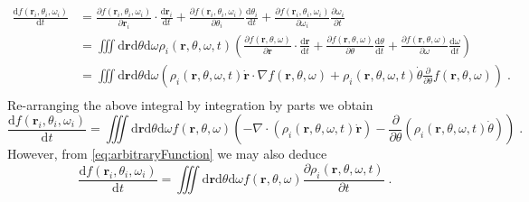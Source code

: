 \documentclass{article}
\begin{document}
\begin{equation}
    \begin{aligned}
        \frac{\text{d}f\left( \mathbf{r}_i,\theta _i,\omega _i \right)}{\text{d}t}&=\frac{\partial f\left( \mathbf{r}_i,\theta _i,\omega _i \right)}{\partial \mathbf{r}_i}\cdot \frac{\text{d}\mathbf{r}_i}{\text{d}t}+\frac{\partial f\left( \mathbf{r}_i,\theta _i,\omega _i \right)}{\partial \theta _i}\frac{\text{d}\theta _i}{\text{d}t}+\frac{\partial f\left( \mathbf{r}_i,\theta _i,\omega _i \right)}{\partial \omega _i}\frac{\partial \omega _i}{\partial t}\\
        &=\iiint{\text{d}\mathbf{r}\text{d}\theta \text{d}\omega \rho _i\left( \mathbf{r},\theta ,\omega ,t \right) \left( \frac{\partial f\left( \mathbf{r},\theta ,\omega \right)}{\partial \mathbf{r}}\cdot \frac{\text{d}\mathbf{r}}{\text{d}t}+\frac{\partial f\left( \mathbf{r},\theta ,\omega \right)}{\partial \theta}\frac{\text{d}\theta}{\text{d}t}+\frac{\partial f\left( \mathbf{r},\theta ,\omega \right)}{\partial \omega}\frac{\text{d}\omega}{\text{d}t} \right)}\\
        &=\iiint{\text{d}\mathbf{r}\text{d}\theta \text{d}\omega \left( \rho _i\left( \mathbf{r},\theta ,\omega ,t \right) \mathbf{\dot{r}}\cdot \nabla f\left( \mathbf{r},\theta ,\omega \right) +\rho _i\left( \mathbf{r},\theta ,\omega ,t \right) \dot{\theta}\frac{\partial}{\partial \theta}f\left( \mathbf{r},\theta ,\omega \right) \right)}\;.\\
    \end{aligned}
\end{equation}
Re-arranging the above integral by integration by parts we obtain
\begin{equation}
    \label{eq:arbitraryFunctionDt1}
    \frac{\text{d}f\left( \mathbf{r}_i,\theta _i,\omega _i \right)}{\text{d}t}=\iiint{\text{d}\mathbf{r}\text{d}\theta \text{d}\omega f\left( \mathbf{r},\theta ,\omega \right) \left( -\nabla \cdot \left( \rho _i\left( \mathbf{r},\theta ,\omega ,t \right) \mathbf{\dot{r}} \right) -\frac{\partial}{\partial \theta}\left( \rho _i\left( \mathbf{r},\theta ,\omega ,t \right) \dot{\theta} \right) \right)}\;.
\end{equation}
However, from \eqref{eq:arbitraryFunction} we may also deduce
\begin{equation}
    \label{eq:arbitraryFunctionDt2}
    \frac{\text{d}f\left( \mathbf{r}_i,\theta _i,\omega _i \right)}{\text{d}t}=\iiint{\text{d}\mathbf{r}\text{d}\theta \text{d}\omega f\left( \mathbf{r},\theta ,\omega \right) \frac{\partial \rho _i\left( \mathbf{r},\theta ,\omega ,t \right)}{\partial t}}\;.
\end{equation}
\end{document}
